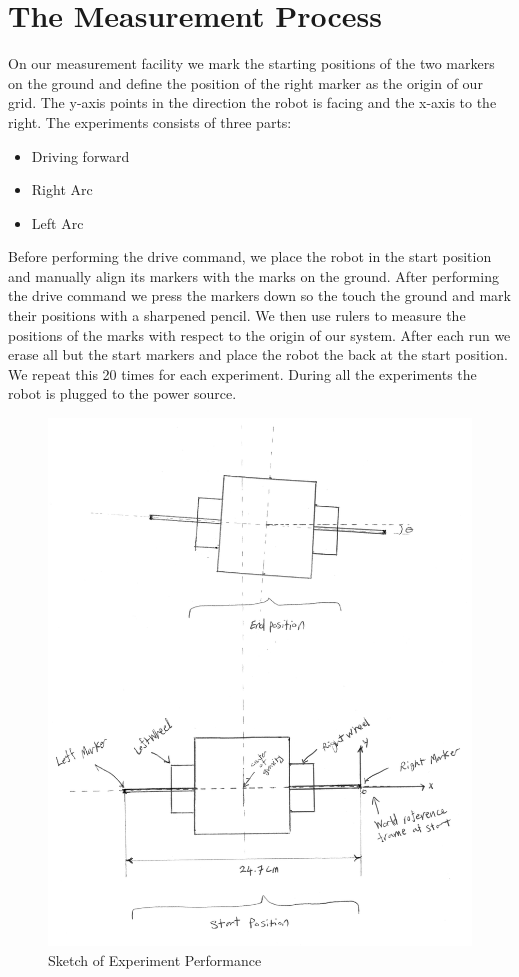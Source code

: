 \documentclass[paper=a4, fontsize=11pt]{scrartcl} %
\numberwithin{equation}{section} %
\numberwithin{figure}{section} %
\numberwithin{table}{section} %
\begin{document}
\section{The Measurement Process}
On our measurement facility we mark the starting positions of the two markers on the ground and define the position of the right marker as the origin of our grid. 
The y-axis points in the direction the robot is facing and the x-axis to the right.
The experiments consists of three parts:
\begin{itemize}
	\item Driving forward
	\item Right Arc
	\item Left Arc
\end{itemize}
Before performing the drive command, we place the robot in the start position and manually align its markers with the marks on the ground.
After performing the drive command we press the markers down so the touch the ground and mark their positions with a sharpened pencil.
We then use rulers to measure the positions of the marks with respect to the origin of our system.
After each run we erase all but the start markers and place the robot the back at the start position.
We repeat this 20 times for each experiment.
During all the experiments the robot is plugged to the power source.

\begin{figure}[H]
 
\includegraphics[width=0.9\linewidth]{experimental_setup.png} 
\caption{Sketch of Experiment Performance}
\label{fig:setup}
\end{figure}
\end{document}
